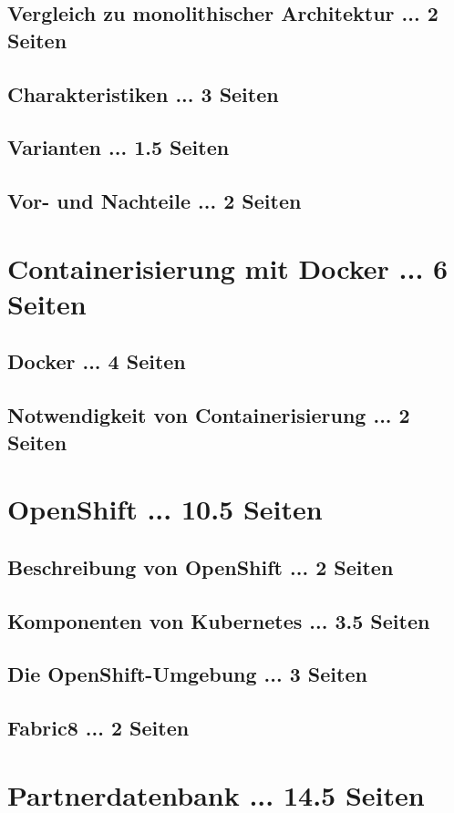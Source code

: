 \documentclass[master,german]{hgbthesis}
\begin{document}
\section{Vergleich zu monolithischer Architektur ... 2 Seiten}
\section{Charakteristiken ... 3 Seiten}
\section{Varianten ... 1.5 Seiten}
\section{Vor- und Nachteile ... 2 Seiten}


\chapter{Containerisierung mit Docker ... 6 Seiten}
\section{Docker ... 4 Seiten}
\section{Notwendigkeit von Containerisierung ... 2 Seiten}


\chapter{OpenShift ... 10.5 Seiten}
\section{Beschreibung von OpenShift ... 2 Seiten}
\section{Komponenten von Kubernetes ... 3.5 Seiten}
\section{Die OpenShift-Umgebung ... 3 Seiten}
\section{Fabric8 ... 2 Seiten}

\chapter{Partnerdatenbank ... 14.5 Seiten}
\end{document}
